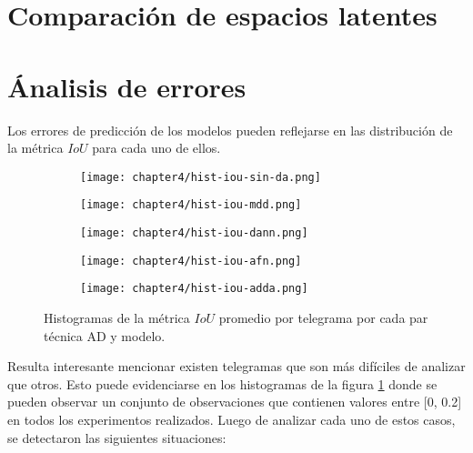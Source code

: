 \section{Comparaci\'on de espacios latentes}

\lipsum[1]

\section{\'Analisis de errores}

Los errores de predicci\'on de los modelos pueden reflejarse en las distribuci\'on de la m\'etrica $IoU$ para cada uno
de ellos.

\begin{figure}[H]
    \centering
    \begin{subfigure}[h]{0.43\textwidth}
        \texttt{[image: chapter4/hist-iou-sin-da.png]}
    \end{subfigure}
    \hfill
    \begin{subfigure}[h]{0.43\textwidth}
        \texttt{[image: chapter4/hist-iou-mdd.png]}
    \end{subfigure}
    \hfill
    \begin{subfigure}[h]{0.43\textwidth}
        \texttt{[image: chapter4/hist-iou-dann.png]}
    \end{subfigure}
    \hfill
    \begin{subfigure}[h]{0.43\textwidth}
        \texttt{[image: chapter4/hist-iou-afn.png]}
    \end{subfigure}
    \hfill
    \begin{subfigure}[h]{0.43\textwidth}
        \texttt{[image: chapter4/hist-iou-adda.png]}
    \end{subfigure}

    \caption{Histogramas de la m\'etrica $IoU$ promedio por telegrama por cada par t\'ecnica AD y modelo.}
    \label{fig:histogramas-ious}
\end{figure}

Resulta interesante mencionar existen telegramas que son m\'as dif\'iciles de analizar que otros. Esto puede
evidenciarse en los histogramas de la figura \ref{fig:histogramas-ious} donde se pueden observar un conjunto de
observaciones que contienen valores entre [0, 0.2] en todos los experimentos realizados. Luego de analizar cada uno de
estos casos, se detectaron las siguientes situaciones:

